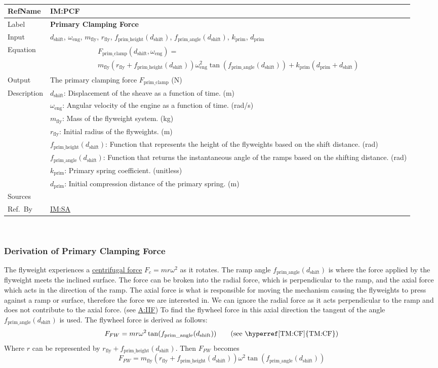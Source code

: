 \documentclass[12pt]{article}
\newcommand{\colAwidth}{0.13\textwidth}
\newcommand{\colBwidth}{0.82\textwidth}
\newcommand{\hpref}[1]{\hyperref[#1]{#1}}
\newcommand{\definstance}[8] {
~\newline
\noindent
\begin{minipage}{\textwidth}
\renewcommand*{\arraystretch}{1.5}
\begin{tabular}{| p{\colAwidth} | p{\colBwidth}|}
  \hline
  \rowcolor[gray]{0.9}
  RefName& \textbf{#1} \label{#1}\\
  \hline
  Label& \bf #2 \\
  \hline
  Input& #3\\
  \hline
  Equation& #4\\
  \hline
  Output& #5\\
  \hline
  Description& #6 \\
  \hline
  Sources& #7 \\
  \hline
  Ref.\ By & #8\\
  \hline
\end{tabular}
\end{minipage}\\
}
\begin{document}
\definstance
{IM:PCF}
{Primary Clamping Force}
{$d_{\text{shift}}$, $\omega_\text{eng}$, $m_\text{fly}$, $r_{\text{fly}}$, $f_{\text{prim\_height}}(d_{\text{shift}})$, $f_{\text{prim\_angle}}(d_{\text{shift}})$, $k_{\text{prim}}$, $d_{\text{prim}}$} %
{
  \begin{multline*}
  F_{\text{prim\_clamp}}(d_\text{shift}, \omega_\text{eng}) = \\
  m_\text{fly} (r_{\text{fly}} + f_{\text{prim\_height}}(d_\text{shift}))
  \omega_\text{eng}^2 \tan(f_{\text{prim\_angle}}(d_\text{shift}))
  + k_{\text{prim}} (d_{\text{prim}} + d_\text{shift})
  \end{multline*}
  }
{The primary clamping force $F_{\text{prim\_clamp}}$ (N)}
{
  $d_\text{shift}$: Displacement of the sheave as a function of time. (m)\\
  &$\omega_\text{eng}$: Angular velocity of the engine as a function of time. (rad/s)\\
  &$m_\text{fly}$: Mass of the flyweight system. (kg) \\ 
  &$r_{\text{fly}}$: Initial radius of the flyweights. (m) \\ 
  &$f_{\text{prim\_height}}(d_{\text{shift}})$: Function that represents the height of the flyweights based on the shift distance. (rad) \\
  &$f_{\text{prim\_angle}}(d_{\text{shift}})$: Function that returns the instantaneous angle of the ramps based on the shifting distance. (rad) \\ 
  &$k_{\text{prim}}$: Primary spring coefficient. (unitless) \\ 
  &$d_{\text{prim}}$: Initial compression distance of the primary spring. (m)
} %
{} %
{\hpref{IM:SA}}

\subsubsection*{Derivation of Primary Clamping Force}

The flyweight experiences a \hyperref[TM:CF]{centrifugal force} {$F_c = m r\omega^2 $} as it rotates. 
The ramp angle $f_{\text{prim\_angle}}(d_{\text{shift}})$ is where the force applied by the flyweight meets the inclined surface.
The force can be broken into the radial force, which is perpendicular to the ramp, and the axial force which acts in the direction of the ramp.
The axial force is what is responsible for moving the mechanism causing the flyweights to press against a ramp or surface, therefore the force we are interested in.
We can ignore the radial force as it acts perpendicular to the ramp and does not contribute to the axial force. (see \hpref{A:IIF})
To find the flywheel force in this axial direction the tangent of the angle $f_{\text{prim\_angle}}(d_{\text{shift}})$ is used.
The flywheel force is derived as follows: 
\[
F_{FW} = m r \omega^2 \tan(f_{\text{prim\_angle}}(d_{\text{shift}})) \tag*{\text{(see \hyperref[TM:CF]{TM:CF})}}
\]
Where \( r \) can be represented by \( r_{\text{fly}} + f_{\text{prim\_height}}(d_{\text{shift}}) \). Then \( F_{FW} \) becomes 
\[
F_{FW} = m_\text{fly} (r_{\text{fly}} + f_{\text{prim\_height}}(d_{\text{shift}}))\omega^2 \tan(f_{\text{prim\_angle}}(d_{\text{shift}}))
\]
\end{document}

